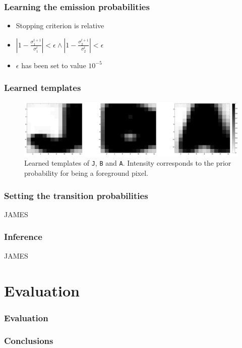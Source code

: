 \documentclass{beamer}
\begin{document}
\begin{frame}
  \frametitle{Learning the emission probabilities}
\begin{itemize}
\item Stopping criterion is relative
\item  $|1-\frac{\sigma_1^{t+1}}{\sigma_1^{t}}| < \epsilon \wedge |1-\frac{\sigma_2^{t+1}}{\sigma_2^{t}}| < \epsilon$
\item$\epsilon$ has been set to value $10^{-5}$
\end{itemize}  
\end{frame}

\begin{frame}
  \frametitle{Learned templates}
\begin{figure}[htp]
\centering
\includegraphics[width=\linewidth]{pics/jba.png}
\caption{Learned templates of \texttt{J}, \texttt{B} and
  \texttt{A}. Intensity corresponds to the prior probability for being
  a foreground pixel.}
\label{fig:templates}
\end{figure}
\end{frame}




\begin{frame}
  \frametitle{Setting the transition probabilities}
  JAMES
\end{frame}


\begin{frame}
  \frametitle{Inference}
  JAMES
\end{frame}

\section{Evaluation}
\begin{frame}
  \frametitle{Evaluation}
  
\end{frame}

\begin{frame}
  \frametitle{Conclusions}
\end{frame}
\end{document}
